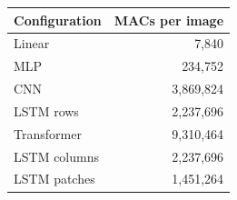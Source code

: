 \begin{tabularx}{\textwidth}{@{}Yr@{}}
\toprule
Configuration & MACs per image \\
\midrule
Linear & 7,840 \\
MLP & 234,752 \\
CNN & 3,869,824 \\
LSTM rows & 2,237,696 \\
Transformer & 9,310,464 \\
LSTM columns & 2,237,696 \\
LSTM patches & 1,451,264 \\
\bottomrule
\end{tabularx}
